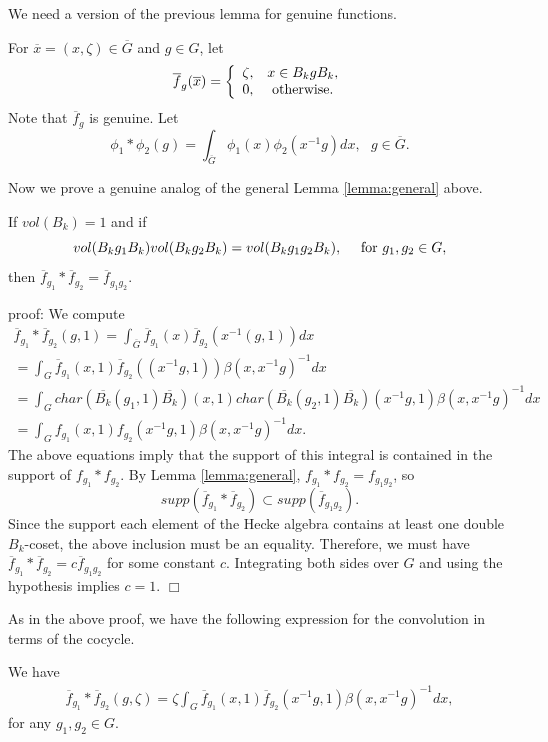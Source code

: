 We need a version of the previous lemma for genuine 
functions. 

For $\overline{x}=(x,\zeta)\in\overline{G}$
and $g\in G$, let
\[
\overline{f}_{g}(\overline{x})
=
\left\{
\begin{array}{cc}
\zeta,& x\in B_kgB_k,\\
0,& {\rm otherwise}.
\end{array}
\right.
\]
Note that $\overline{f}_g$ is genuine. Let
\[
\phi_1*\phi_2(g)=
\int_{\overline{G}}\phi_1(x)\phi_2(x^{-1}g) dx,
\ \ \ g\in \overline{G}.
\]

Now we prove a genuine 
analog of the general Lemma \ref{lemma:general} above.

\begin{lemma} 
If $vol(B_k)=1$ and if 
\[
vol(B_kg_1B_k)
vol(B_kg_2B_k)
=vol(B_kg_1g_2B_k),\ \ \ \ {\rm for}\ g_1,g_2\in G,
\]
then $\overline{f}_{g_1}*\overline{f}_{g_2}=
\overline{f}_{g_1g_2}$.
\label{lemma:genuine}
\end{lemma}

proof: We compute
\[
\begin{array}{c}
\overline{f}_{g_1}*\overline{f}_{g_2}(g,1)=
\int_{\overline{G}}
\overline{f}_{g_1}(x)\overline{f}_{g_2}(x^{-1}(g,1))dx\\
=\int_{G}\overline{f}_{g_1}(x,1)\overline{f}_{g_2}((x^{-1}g,1))
\beta(x,x^{-1}g)^{-1}dx\\
=\int_{G}
char(\overline{B_k}(g_1,1)\overline{B_k})(x,1)
char(\overline{B_k}(g_2,1)\overline{B_k})(x^{-1}g,1)
\beta(x,x^{-1}g)^{-1}dx\\
=\int_{G}f_{g_1}(x,1)f_{g_2}(x^{-1}g,1)
\beta(x,x^{-1}g)^{-1}dx.
\end{array}
\]
The above equations imply that
the support of this integral is contained in the support
of $f_{g_1}*f_{g_2}$. By Lemma \ref{lemma:general},
$f_{g_1}*f_{g_2}=f_{g_1g_2}$, so 
\[
supp(\overline{f}_{g_1}*\overline{f}_{g_2})
\subset supp(\overline{f}_{g_1g_2}).
\]
Since the support each element of the Hecke algebra 
contains at least one double $B_k$-coset, the above
inclusion must be an equality. Therefore, we must have
$\overline{f}_{g_1}*\overline{f}_{g_2}=c\overline{f}_{g_1g_2}$
for some constant $c$. Integrating both sides over 
$G$ and using the hypothesis implies $c=1$.   $\Box$

As in the above proof, we have the following expression
for the convolution in terms of the cocycle.

\begin{lemma}
\label{lemma:convolve}
We have
\[
\begin{array}{c}
\overline{f}_{g_1}*\overline{f}_{g_2}(g,\zeta)
=\zeta\int_{G}\overline{f}_{g_1}(x,1)\overline{f}_{g_2}(x^{-1}g,1)
\beta(x,x^{-1}g)^{-1}dx,
\end{array}
\]
for any $g_1,g_2\in G$.
\end{lemma}

